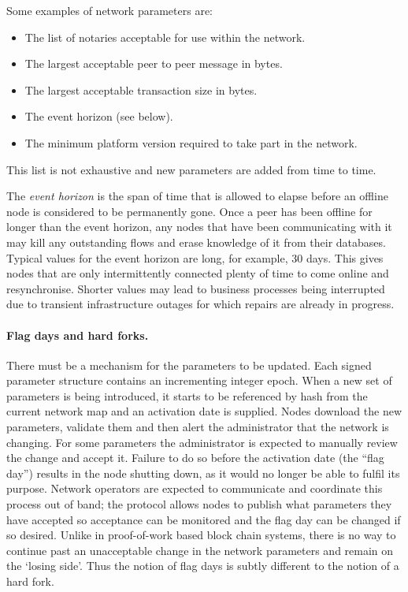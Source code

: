 \documentclass{article}
\begin{document}
Some examples of network parameters are:

\begin{itemize}
    \item The list of notaries acceptable for use within the network.
    \item The largest acceptable peer to peer message in bytes.
    \item The largest acceptable transaction size in bytes.
    \item The event horizon (see below).
    \item The minimum platform version required to take part in the network.
\end{itemize}

This list is not exhaustive and new parameters are added from time to time.

The \emph{event horizon} is the span of time that is allowed to elapse before an offline node is considered to be
permanently gone. Once a peer has been offline for longer than the event horizon, any nodes that have been
communicating with it may kill any outstanding flows and erase knowledge of it from their databases. Typical values
for the event horizon are long, for example, 30 days. This gives nodes that are only intermittently connected
plenty of time to come online and resynchronise. Shorter values may lead to business processes being interrupted
due to transient infrastructure outages for which repairs are already in progress.

\paragraph{Flag days and hard forks.}There must be a mechanism for the parameters to be updated. Each signed
parameter structure contains an incrementing integer epoch. When a new set of parameters is being introduced, it
starts to be referenced by hash from the current network map and an activation date is supplied. Nodes download the
new parameters, validate them and then alert the administrator that the network is changing. For some parameters
the administrator is expected to manually review the change and accept it. Failure to do so before the activation
date (the ``flag day'') results in the node shutting down, as it would no longer be able to fulfil its purpose.
Network operators are expected to communicate and coordinate this process out of band; the protocol allows nodes to
publish what parameters they have accepted so acceptance can be monitored and the flag day can be changed if
so desired. Unlike in proof-of-work based block chain systems, there is no way to continue past an unacceptable
change in the network parameters and remain on the `losing side'. Thus the notion of flag days is subtly different
to the notion of a hard fork.
\end{document}

